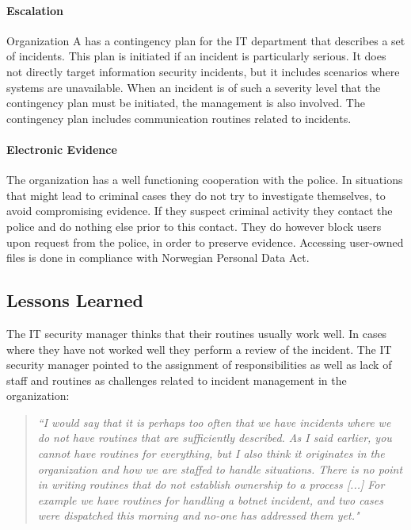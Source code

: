 \paragraph{Escalation}
Organization A has a contingency plan for the IT department that describes a set of incidents. This plan is initiated if an incident is particularly serious. It does not directly target information security incidents, but it includes scenarios where systems are unavailable. When an incident is of such a severity level that the contingency plan must be initiated, the management is also involved. The contingency plan includes communication routines related to incidents. 

\paragraph{Electronic Evidence}
The organization has a well functioning cooperation with the police. In situations that might lead to criminal cases they do not try to investigate themselves, to avoid compromising evidence. If they suspect criminal activity they contact the police and do nothing else prior to this contact. They do however block users upon request from the police, in order to preserve evidence. Accessing user-owned files is done in compliance with Norwegian Personal Data Act.

\subsection{Lessons Learned}
The IT security manager thinks that their routines usually work well. In cases where they have not worked well they perform a review of the incident. The IT security manager pointed to the assignment of responsibilities as well as lack of staff and routines as challenges related to incident management in the organization: 

\begin{quote}
\textit{``I would say that it is perhaps too often that we have incidents where we do not have routines that are sufficiently described. %
As I said earlier, you cannot have routines for everything, but I also think it originates in the organization and how we are staffed to handle situations. There is no point in writing routines that do not establish ownership to a process [...] For example we have routines for handling a botnet incident, and two cases were dispatched this morning and no-one has addressed them yet."}
\end{quote}

